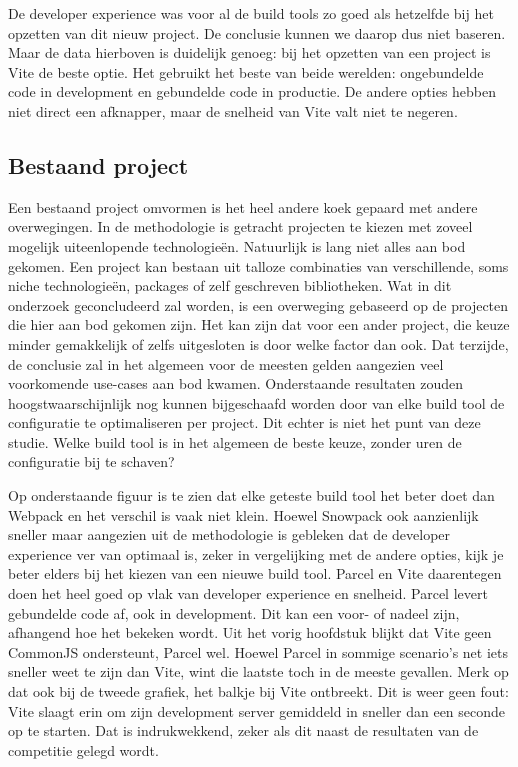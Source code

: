 De developer experience was voor al de build tools zo goed als hetzelfde bij het opzetten van dit nieuw project. De conclusie kunnen we daarop dus niet baseren. Maar de data hierboven is duidelijk genoeg: bij het opzetten van een project is Vite de beste optie. Het gebruikt het beste van beide werelden: ongebundelde code in development en gebundelde code in productie. De andere opties hebben niet direct een afknapper, maar de snelheid van Vite valt niet te negeren.

\subsection{Bestaand project}
Een bestaand project omvormen is het heel andere koek gepaard met andere overwegingen. In de methodologie is getracht projecten te kiezen met zoveel mogelijk uiteenlopende technologieën. Natuurlijk is lang niet alles aan bod gekomen. Een project kan bestaan uit talloze combinaties van verschillende, soms niche technologieën, packages of zelf geschreven bibliotheken. Wat in dit onderzoek geconcludeerd zal worden, is een overweging gebaseerd op de projecten die hier aan bod gekomen zijn. Het kan zijn dat voor een ander project, die keuze minder gemakkelijk of zelfs uitgesloten is door welke factor dan ook. Dat terzijde, de conclusie zal in het algemeen voor de meesten gelden aangezien veel voorkomende use-cases aan bod kwamen. Onderstaande resultaten zouden hoogstwaarschijnlijk nog kunnen bijgeschaafd worden door van elke build tool de configuratie te optimaliseren per project. Dit echter is niet het punt van deze studie. Welke build tool is in het algemeen de beste keuze, zonder uren de configuratie bij te schaven?

Op onderstaande figuur is te zien dat elke geteste build tool het beter doet dan Webpack en het verschil is vaak niet klein. Hoewel Snowpack ook aanzienlijk sneller maar aangezien uit de methodologie is gebleken dat de developer experience ver van optimaal is, zeker in vergelijking met de andere opties, kijk je beter elders bij het kiezen van een nieuwe build tool. Parcel en Vite daarentegen doen het heel goed op vlak van developer experience en snelheid. Parcel levert gebundelde code af, ook in development. Dit kan een voor- of nadeel zijn, afhangend hoe het bekeken wordt. Uit het vorig hoofdstuk blijkt dat Vite geen CommonJS ondersteunt, Parcel wel. Hoewel Parcel in sommige scenario’s net iets sneller weet te zijn dan Vite, wint die laatste toch in de meeste gevallen. Merk op dat ook bij de tweede grafiek, het balkje bij Vite ontbreekt. Dit is weer geen fout: Vite slaagt erin om zijn development server gemiddeld in sneller dan een seconde op te starten. Dat is indrukwekkend, zeker als dit naast de resultaten van de competitie gelegd wordt. 


